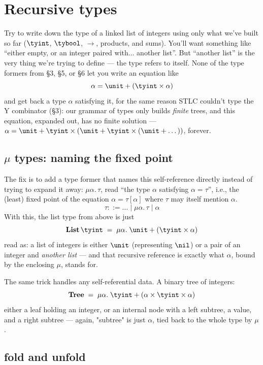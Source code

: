 \section{Recursive types}

Try to write down the type of a linked list of integers using only what we've built so far ($\tyint$, $\tybool$, $\to$, products, and sums). You'll want something like ``either empty, or an integer paired with... another list''. But ``another list'' is the very thing we're trying to define — the type refers to itself. None of the type formers from \S3, \S5, or \S6 let you write an equation like
\[
  \alpha = \unit + (\tyint \times \alpha)
\]
and get back a type $\alpha$ satisfying it, for the same reason STLC couldn't type the Y combinator (\S3): our grammar of types only builds \emph{finite} trees, and this equation, expanded out, has no finite solution — $\alpha = \unit + \tyint\times(\unit+\tyint\times(\unit+\dots))$, forever.

\subsection{$\mu$ types: naming the fixed point}

The fix is to add a type former that names this self-reference directly instead of trying to expand it away: $\mu\alpha.\,\tau$, read ``the type $\alpha$ satisfying $\alpha = \tau$'', i.e., the (least) fixed point of the equation $\alpha = \tau[\alpha]$ where $\tau$ may itself mention $\alpha$.
\[
  \tau ::= \dots \mid \mu\alpha.\,\tau \mid \alpha
\]
With this, the list type from above is just
\[
  \mathbf{List}\,\tyint \;=\; \mu\alpha.\; \unit + (\tyint \times \alpha)
\]
read as: a list of integers is either $\unit$ (representing $\nil$) or a pair of an integer and \emph{another list} — and that recursive reference is exactly what $\alpha$, bound by the enclosing $\mu$, stands for.

The same trick handles any self-referential data. A binary tree of integers:
\[
  \mathbf{Tree} \;=\; \mu\alpha.\; \tyint + (\alpha \times \tyint \times \alpha)
\]
either a leaf holding an integer, or an internal node with a left subtree, a value, and a right subtree — again, "subtree" is just $\alpha$, tied back to the whole type by $\mu$.

\subsection{fold and unfold}

